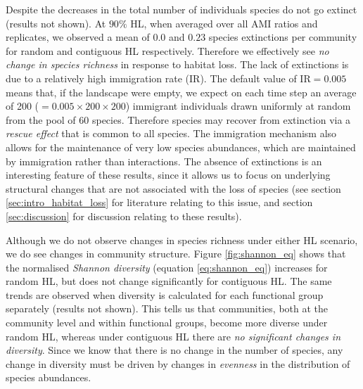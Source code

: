 
Despite the decreases in the total number of individuals species do not go extinct (results not shown). At $90\%$ HL, when averaged over all AMI ratios and replicates, we observed a mean of $0.0$ and $0.23$ species extinctions per community for random and contiguous HL respectively. Therefore we effectively see \emph{no change in species richness} in response to habitat loss. The lack of extinctions is due to a relatively high immigration rate (IR). The default value of IR$=0.005$ means that, if the landscape were empty, we expect  on each time step an average of 200 ($=0.005 \times 200 \times 200$) immigrant individuals drawn uniformly at random from the pool of 60 species. Therefore species may recover from extinction via a \emph{rescue effect} that is common to all species. The immigration mechanism also allows for the maintenance of very low species abundances, which are maintained by immigration rather than interactions. The absence of extinctions is an interesting feature of these results, since it allows us to focus on underlying structural changes that are not associated with the loss of species (see section \ref{sec:intro_habitat_loss} for literature relating to this issue, and section \ref{sec:discussion} for discussion relating to these results).

Although we do not observe changes in species richness under either HL scenario, we do see changes in community structure. Figure \ref{fig:shannon_eq} shows that the normalised \emph{Shannon diversity} (equation \ref{eq:shannon_eq}) increases for random HL, but does not change significantly for contiguous HL. The same trends are observed when diversity is calculated for each functional group separately (results not shown). This tells us that communities, both at the community level and within functional groups, become more diverse under random HL, whereas under contiguous HL there are \emph{no significant changes in diversity}. Since we know that there is no change in the number of species, any change in diversity must be driven by changes in \emph{evenness} in the distribution of species abundances.
 
